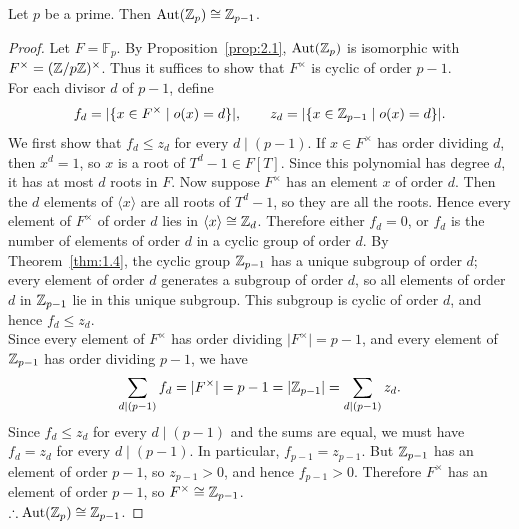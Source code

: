 \documentclass[../Odyssey_Project.tex]{subfiles}
\begin{document}
\begin{proposition}
\label{prop:2.2}
Let $p$ be a prime. Then $\operatorname{Aut}(\mathbb{Z}_p) \cong \mathbb{Z}_{p-1}$.
\end{proposition}
\begin{proof}
    Let $F = \mathbb{F}_p$. By Proposition~\ref{prop:2.1}, $\operatorname{Aut}(\mathbb{Z}_p)$ is isomorphic with $F^{\times} = (\mathbb{Z}/p\mathbb{Z})^{\times}$. Thus it suffices to show that $F^{\times}$ is cyclic of order $p - 1$. \\
    For each divisor $d$ of $p - 1$, define
    \[
        f_d = \lvert \{x \in F^{\times} \mid o(x) = d\} \rvert,
        \qquad
        z_d = \lvert \{x \in \mathbb{Z}_{p - 1} \mid o(x) = d\} \rvert.
    \]
    We first show that $f_d \leq z_d$ for every $d \mid (p - 1)$. If $x \in F^{\times}$ has order dividing $d$, then $x^d = 1$, so $x$ is a root of $T^d - 1 \in F[T]$. Since this polynomial has degree $d$, it has at most $d$ roots in $F$. Now suppose $F^{\times}$ has an element $x$ of order $d$. Then the $d$ elements of $\langle x \rangle$ are all roots of $T^d - 1$, so they are all the roots. Hence every element of $F^{\times}$ of order $d$ lies in $\langle x \rangle \cong \mathbb{Z}_d$. Therefore either $f_d = 0$, or $f_d$ is the number of elements of order $d$ in a cyclic group of order $d$. By Theorem~\ref{thm:1.4}, the cyclic group $\mathbb{Z}_{p - 1}$ has a unique subgroup of order $d$; every element of order $d$ generates a subgroup of order $d$, so all elements of order $d$ in $\mathbb{Z}_{p - 1}$ lie in this unique subgroup. This subgroup is cyclic of order $d$, and hence $f_d \leq z_d$. \\
    Since every element of $F^{\times}$ has order dividing $\lvert F^{\times} \rvert = p - 1$, and every element of $\mathbb{Z}_{p - 1}$ has order dividing $p - 1$, we have
    \[
        \sum_{d \mid (p - 1)} f_d = \lvert F^{\times} \rvert = p - 1
        = \lvert \mathbb{Z}_{p - 1} \rvert = \sum_{d \mid (p - 1)} z_d.
    \]
    Since $f_d \leq z_d$ for every $d \mid (p - 1)$ and the sums are equal, we must have $f_d = z_d$ for every $d \mid (p - 1)$. In particular, $f_{p - 1} = z_{p - 1}$. But $\mathbb{Z}_{p - 1}$ has an element of order $p - 1$, so $z_{p - 1} > 0$, and hence $f_{p - 1} > 0$. Therefore $F^{\times}$ has an element of order $p - 1$, so $F^{\times} \cong \mathbb{Z}_{p - 1}$. \\
    \(\therefore \operatorname{Aut}(\mathbb{Z}_p) \cong \mathbb{Z}_{p - 1}\).
\end{proof}
\end{document}
